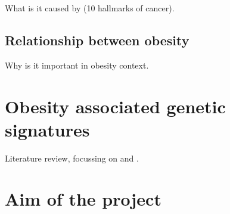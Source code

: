 What is it caused by (10 hallmarks of cancer).

\subsection{Relationship between obesity}
\label{subsec:obsbackground}

Why is it important in obesity context.

\section{Obesity associated genetic signatures}
\label{sec:obsgene}

Literature review, focussing on \citet{Creighton2012} and \citet{Fuentes-Mattei2014}.

\section{Aim of the project}
\label{sec:aim}

